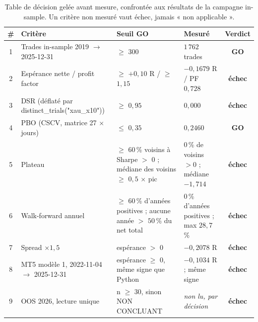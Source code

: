 \begin{table}[htbp]
\centering
\footnotesize
\caption{Table de décision gelée avant mesure, confrontée aux résultats de la campagne in-sample. Un critère non mesuré vaut échec, jamais « non applicable ».}
\label{tab:x10_decision}
\begin{tabular}{c p{4.3cm} p{3.3cm} p{3.6cm} c}
\toprule
\textbf{\#} & \textbf{Critère} & \textbf{Seuil GO} & \textbf{Mesuré} & \textbf{Verdict} \\
\midrule
1 & Trades in-sample 2019 $\rightarrow$ 2025-12-31 & $\geq$ 300 & $1\,762$ trades & \textcolor{rsiGreen}{\textbf{GO}} \\
2 & Espérance nette / profit factor & $\geq$ $+0{,}10$ R / $\geq$ $1{,}15$ & $-0{,}1679$ R / PF $0{,}728$ & \textcolor{combinedBurgundy}{\textbf{échec}} \\
3 & DSR (déflaté par distinct\_trials("xau\_x10")) & $\geq$ $0{,}95$ & $0{,}000$ & \textcolor{combinedBurgundy}{\textbf{échec}} \\
4 & PBO (CSCV, matrice 27 $\times$ jours) & $\leq$ $0{,}35$ & $0{,}2460$ & \textcolor{rsiGreen}{\textbf{GO}} \\
5 & Plateau & $\geq$ $60$\,\% voisins à Sharpe $>$ 0 ; médiane des voisins $\geq$ $0{,}5$ $\times$ pic & $0$\,\% de voisins $> 0$ ; médiane $-1{,}714$ & \textcolor{combinedBurgundy}{\textbf{échec}} \\
6 & Walk-forward annuel & $\geq$ $60$\,\% d'années positives ; aucune année $>$ $50$\,\% du net total & $0$\,\% d'années positives ; max $28{,}7$\,\% & \textcolor{combinedBurgundy}{\textbf{échec}} \\
7 & Spread $\times 1{,}5$ & espérance $>$ 0 & $-0{,}2078$ R & \textcolor{combinedBurgundy}{\textbf{échec}} \\
8 & MT5 modèle 1, 2022-11-04 $\rightarrow$ 2025-12-31 & espérance $\geq$ 0, même signe que Python & $-0{,}1034$ R ; même signe & \textcolor{combinedBurgundy}{\textbf{échec}} \\
9 & OOS 2026, lecture unique & n $\geq$ 30, sinon NON CONCLUANT & \emph{non lu, par décision} & \textcolor{combinedBurgundy}{\textbf{échec}} \\
\bottomrule
\end{tabular}
\end{table}
